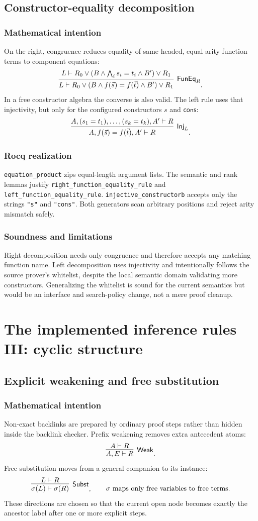 \documentclass[11pt,oneside]{book}
\DeclareRobustCommand{\code}[1]{\nolinkurl{#1}}
\newcommand{\mathintent}{\subsection*{Mathematical intention}}
\newcommand{\rocqreal}{\subsection*{Rocq realization}}
\newcommand{\soundlim}{\subsection*{Soundness and limitations}}
\begin{document}
\section{Constructor-equality decomposition}

\mathintent

On the right, congruence reduces equality of same-headed, equal-arity function
terms to component equations:
\[
 \infer[\mathsf{FunEq}_R]
       {L\vdash R_0\lor(B\land f(\vec s)=f(\vec t)\land B')\lor R_1}
       {L\vdash R_0\lor(B\land \bigwedge_i s_i=t_i\land B')\lor R_1}.
\]
In a free constructor algebra the converse is also valid.  The left rule uses
that injectivity, but only for the configured constructors \(s\) and
\(\mathsf{cons}\):
\[
 \infer[\mathsf{Inj}_L]
       {A,f(\vec s)=f(\vec t),A'\vdash R}
       {A,(s_1=t_1),\ldots,(s_k=t_k),A'\vdash R}.
\]

\rocqreal

\code{equation_product} zips equal-length argument lists.  The semantic and
rank lemmas justify \code{right_function_equality_rule} and
\code{left_function_equality_rule}.  \code{injective_constructorb} accepts
only the strings \code{"s"} and \code{"cons"}.  Both generators scan arbitrary
positions and reject arity mismatch safely.

\soundlim

Right decomposition needs only congruence and therefore accepts any matching
function name.  Left decomposition uses injectivity and intentionally follows
the source prover's whitelist, despite the local semantic domain validating
more constructors.  Generalizing the whitelist is sound for the current
semantics but would be an interface and search-policy change, not a mere proof
cleanup.

\chapter{The implemented inference rules III: cyclic structure}
\label{ch:rules-cyclic}

\section{Explicit weakening and free substitution}

\mathintent

Non-exact backlinks are prepared by ordinary proof steps rather than hidden
inside the backlink checker.  Prefix weakening removes extra antecedent atoms:
\[
 \infer[\mathsf{Weak}]
       {A,E\vdash R}
       {A\vdash R}.
\]
Free substitution moves from a general companion to its instance:
\[
 \infer[\mathsf{Subst}]
       {\sigma(L)\vdash\sigma(R)}
       {L\vdash R},
 \qquad \sigma\text{ maps only free variables to free terms}.
\]
These directions are chosen so that the current open node becomes exactly the
ancestor label after one or more explicit steps.
\end{document}
